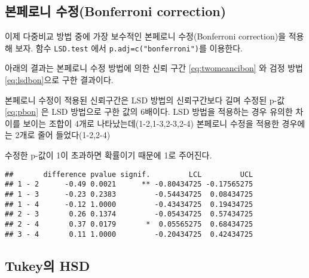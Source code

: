 \documentclass[
]{book}
\newenvironment{Shaded}{\begin{snugshade}}{\end{snugshade}}
\newcommand{\AttributeTok}[1]{\textcolor[rgb]{0.77,0.63,0.00}{#1}}
\newcommand{\ConstantTok}[1]{\textcolor[rgb]{0.00,0.00,0.00}{#1}}
\newcommand{\FloatTok}[1]{\textcolor[rgb]{0.00,0.00,0.81}{#1}}
\newcommand{\FunctionTok}[1]{\textcolor[rgb]{0.00,0.00,0.00}{#1}}
\newcommand{\NormalTok}[1]{#1}
\newcommand{\OtherTok}[1]{\textcolor[rgb]{0.56,0.35,0.01}{#1}}
\newcommand{\SpecialCharTok}[1]{\textcolor[rgb]{0.00,0.00,0.00}{#1}}
\newcommand{\StringTok}[1]{\textcolor[rgb]{0.31,0.60,0.02}{#1}}
\begin{document}
\hypertarget{uxbcf8uxd398uxb85cuxb2c8-uxc218uxc815bonferroni-correction}{%
\subsection{본페로니 수정(Bonferroni correction)}\label{uxbcf8uxd398uxb85cuxb2c8-uxc218uxc815bonferroni-correction}}

이제 다중비교 방법 중에 가장 보수적인 본페로니 수정(Bonferroni
correction)을 적용해 보자. 함수 \texttt{LSD.test} 에서
\texttt{p.adj=c("bonferroni")}를 이용한다.

아래의 결과는 본페로니 수정 방법에 의한 신뢰 구간
\eqref{eq:twomeancibon} 와 검정 방법 \eqref{eq:lsdbon}으로 구한 결과이다.

본페로니 수정이 적용된 신뢰구간은 LSD 방법의
신뢰구간보다 길며 수정된 p-값 \eqref{eq:pbon} 은 LSD 방법으로 구한 값의 6배이다. LSD 방법을
적용하는 경우 유의한 차이를 보이는 조합이 4개로
나타났는데(1-2,1-3,2-3,2-4) 본페로니 수정을 적용한 경우에는 2개로 줄어
들었다(1-2,2-4)

수정한 p-값이 1이 초과하면 확률이기 때문에 1로 주어진다.

\begin{Shaded}
\end{Shaded}

\begin{verbatim}
##       difference pvalue signif.         LCL         UCL
## 1 - 2      -0.49 0.0021      ** -0.80434725 -0.17565275
## 1 - 3      -0.23 0.2383         -0.54434725  0.08434725
## 1 - 4      -0.12 1.0000         -0.43434725  0.19434725
## 2 - 3       0.26 0.1374         -0.05434725  0.57434725
## 2 - 4       0.37 0.0179       *  0.05565275  0.68434725
## 3 - 4       0.11 1.0000         -0.20434725  0.42434725
\end{verbatim}

\hypertarget{tukeyuxc758-hsd}{%
\subsection{Tukey의 HSD}\label{tukeyuxc758-hsd}}
\end{document}
